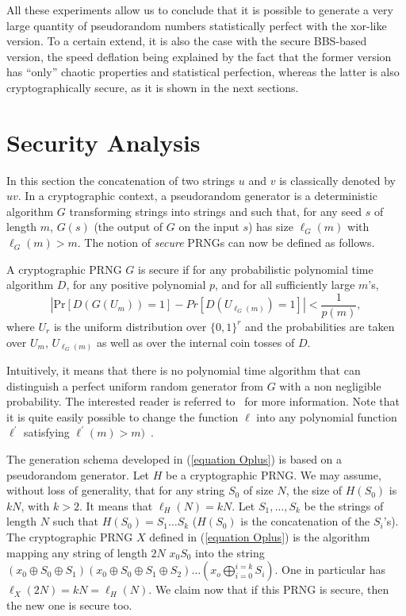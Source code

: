 \documentclass{article}
\begin{document}
All  these  experiments allow  us  to conclude  that  it  is possible  to
generate a very large quantity of pseudorandom  numbers statistically perfect with the  xor-like version.
To a certain extend, it is also the case with the secure BBS-based version, the speed deflation being
explained by the fact that the former  version has ``only''
chaotic properties and statistical perfection, whereas the latter is also cryptographically secure,
as it is shown in the next sections.







\section{Security Analysis}
\label{sec:security analysis}



In this section the concatenation of two strings $u$ and $v$ is classically
denoted by $uv$.
In a cryptographic context, a pseudorandom generator is a deterministic
algorithm $G$ transforming strings  into strings and such that, for any
seed $s$ of length $m$, $G(s)$ (the output of $G$ on the input $s$) has size
$\ell_G(m)$ with $\ell_G(m)>m$.
The notion of {\it secure} PRNGs can now be defined as follows. 

\begin{definition}
A cryptographic PRNG $G$ is secure if for any probabilistic polynomial time
algorithm $D$, for any positive polynomial $p$, and for all sufficiently
large $m$'s,
$$| \mathrm{Pr}[D(G(U_m))=1]-Pr[D(U_{\ell_G(m)})=1]|< \frac{1}{p(m)},$$
where $U_r$ is the uniform distribution over $\{0,1\}^r$ and the
probabilities are taken over $U_m$, $U_{\ell_G(m)}$ as well as over the
internal coin tosses of $D$. 
\end{definition}

Intuitively, it means that there is no polynomial time algorithm that can
distinguish a perfect uniform random generator from $G$ with a non
negligible probability. The interested reader is referred
to~\cite[chapter~3]{Goldreich} for more information. Note that it is
quite easily possible to change the function $\ell$ into any polynomial
function $\ell^\prime$ satisfying $\ell^\prime(m)>m)$~\cite[Chapter 3.3]{Goldreich}.

The generation schema developed in (\ref{equation Oplus}) is based on a
pseudorandom generator. Let $H$ be a cryptographic PRNG. We may assume,
without loss of generality, that for any string $S_0$ of size $N$, the size
of $H(S_0)$ is $kN$, with $k>2$. It means that $\ell_H(N)=kN$. 
Let $S_1,\ldots,S_k$ be the 
strings of length $N$ such that $H(S_0)=S_1 \ldots S_k$ ($H(S_0)$ is the concatenation of
the $S_i$'s). The cryptographic PRNG $X$ defined in (\ref{equation Oplus})
is the algorithm mapping any string of length $2N$ $x_0S_0$ into the string
$(x_0\oplus S_0 \oplus S_1)(x_0\oplus S_0 \oplus S_1\oplus S_2)\ldots
(x_o\bigoplus_{i=0}^{i=k}S_i)$. One in particular has $\ell_{X}(2N)=kN=\ell_H(N)$. 
We claim now that if this PRNG is secure,
then the new one is secure too.
\end{document}
